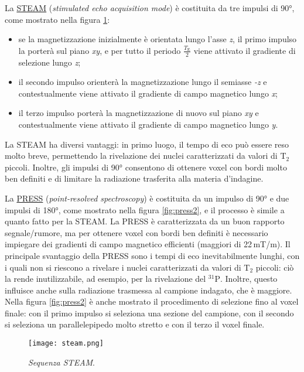 \documentclass{report}
\newcommand{\figref}[1]{figura \ref{#1}}
\numberwithin{equation}{section}
\numberwithin{figure}{section}
\begin{document}
La \underline{STEAM} (\textit{stimulated echo acquisition mode}) è costituita da tre impulsi di 90°, come mostrato nella \figref{fig:steam}: 
\begin{itemize}[label=$-$]
    \item se la magnetizzazione inizialmente è orientata lungo l'asse \textit{z}, il primo impulso la porterà sul piano \textit{xy}, e per tutto il periodo $\frac{T_\mathrm{E}}{2}$ viene attivato il gradiente di selezione lungo \textit{z};
    \item il secondo impulso orienterà la magnetizzazione lungo il semiasse \textit{-z} e contestualmente viene attivato il gradiente di campo magnetico lungo \textit{x};
    \item il terzo impulso porterà la magnetizzazione di nuovo sul piano \textit{xy} e contestualmente viene attivato il gradiente di campo magnetico lungo \textit{y}.
\end{itemize}
La STEAM ha diversi vantaggi: in primo luogo, il tempo di eco può essere reso molto breve, permettendo la rivelazione dei nuclei caratterizzati da valori di $\mathrm{T_2}$ piccoli. Inoltre, gli impulsi di 90° consentono di ottenere voxel con bordi molto ben definiti e di limitare la radiazione trasferita alla materia d'indagine.

La \underline{PRESS} (\textit{point-resolved spectroscopy}) è costituita da un impulso di 90° e due impulsi di 180°, come mostrato nella \figref{fig:press2}, e il processo è simile a quanto fatto per la STEAM. La PRESS è caratterizzata da un buon rapporto segnale/rumore, ma per ottenere voxel con bordi ben definiti è necessario impiegare dei gradienti di campo magnetico efficienti (maggiori di 22\,mT/m). Il principale svantaggio della PRESS sono i tempi di eco inevitabilmente lunghi, con i quali non si riescono a rivelare i nuclei caratterizzati da valori di $\mathrm{T_2}$ piccoli: ciò la rende inutilizzabile, ad esempio, per la rivelazione del $\mathrm{^{31}P}$. Inoltre, questo influisce anche sulla radiazione trasmessa al campione indagato, che è maggiore. Nella \figref{fig:press2} è anche mostrato il procedimento di selezione fino al voxel finale: con il primo impulso si seleziona una sezione del campione, con il secondo si seleziona un parallelepipedo molto stretto e con il terzo il voxel finale.

\begin{figure}[htp]
\centering
\texttt{[image: steam.png]}
\caption{\label{fig:steam} \textit{Sequenza STEAM}.}
\end{figure}
\end{document}
